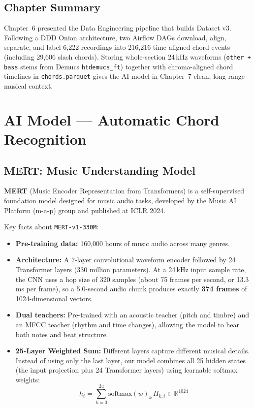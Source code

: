 \documentclass[a4paper]{article}
\begin{document}
\subsection{Chapter Summary}

Chapter~6 presented the Data Engineering pipeline that builds Dataset v3. Following a DDD Onion architecture, two Airflow DAGs download, align, separate, and label 6,222 recordings into 216,216 time-aligned chord events (including 29,606 slash chords). Storing whole-section 24\,kHz waveforms (\texttt{other + bass} stems from Demucs \texttt{htdemucs\_ft}) together with chroma-aligned chord timelines in \texttt{chords.parquet} gives the AI model in Chapter~7 clean, long-range musical context.


\newpage
\section{AI Model --- Automatic Chord Recognition}

\subsection{MERT: Music Understanding Model}

\textbf{MERT} (Music Encoder Representation from Transformers) is a self-supervised foundation model designed for music audio tasks, developed by the Music AI Platform (m-a-p) group and published at ICLR 2024.

Key facts about \texttt{MERT-v1-330M}:
\begin{itemize}
    \item \textbf{Pre-training data:} 160,000 hours of music audio across many genres.
    \item \textbf{Architecture:} A 7-layer convolutional waveform encoder followed by 24 Transformer layers (330 million parameters). At a 24\,kHz input sample rate, the CNN uses a hop size of 320 samples (about 75 frames per second, or 13.3\,ms per frame), so a 5.0-second audio chunk produces exactly \textbf{374 frames} of 1024-dimensional vectors.
    \item \textbf{Dual teachers:} Pre-trained with an acoustic teacher (pitch and timbre) and an MFCC teacher (rhythm and time changes), allowing the model to hear both notes and beat structure.
    \item \textbf{25-Layer Weighted Sum:} Different layers capture different musical details. Instead of using only the last layer, our model combines all 25 hidden states (the input projection plus 24 Transformer layers) using learnable softmax weights:
    \[
        h_t = \sum_{k=0}^{24} \text{softmax}(w)_k \, H_{k,t} \in \mathbb{R}^{1024}
    \]
\end{itemize}
\end{document}
